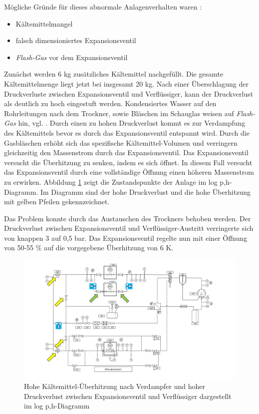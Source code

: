 Mögliche Gründe für dieses abnormale Anlagenverhalten waren :

\begin{itemize}
\item Kältemittelmangel
\item falsch dimensioniertes Expansionsventil
\item \textit{Flash-Gas} vor dem Expansionsventil
\end{itemize}

Zunächst werden 6 kg zusätzliches Kältemittel nachgefüllt. Die gesamte Kältemittelmenge liegt jetzt bei insgesamt 20 kg. Nach einer Überschlagung der Druckverluste zwischen Expansionsventil und Verflüssiger, kann der Druckverlust als deutlich zu hoch eingestuft werden. Kondensiertes Wasser auf den Rohrleitungen nach dem Trockner, sowie Bläschen im Schauglas weisen auf \textit{Flash-Gas} hin, vgl. \citep{GAGKG2010}.
Durch einen zu hohen Druckverlust kommt es zur Verdampfung des Kältemittels bevor es durch das Expansionsventil entspannt wird. Durch die Gasbläschen erhöht sich das spezifische Kältemittel-Volumen und verringern gleichzeitig den Massenstrom durch das Expansionsventil. Das Expansionsventil versucht die Überhitzung zu senken, indem es sich öffnet. In diesem Fall versucht das Expansionsventil durch eine vollständige Öffnung einen höheren Massenstrom zu erwirken. Abbildung \ref{fig:Problem_Trockner} zeigt die Zustandspunkte der Anlage im log p,h-Diagramm. Im Diagramm sind der hohe Druckverlust und die hohe Überhitzung mit gelben Pfeilen gekennzeichnet. 

Das Problem konnte durch das Austauschen des Trockners behoben werden. Der Druckverlust zwischen Expansionsventil und Verflüssiger-Austritt verringerte sich von knappen 3 auf 0,5 bar. Das Expansionsventil regelte nun mit einer Öffnung von 50-55 $\%$ auf die vorgegebene Überhitzung von 6 K. 


\begin{figure}[h]
\centering		\includegraphics[page= 2,width=1.120\textwidth]{Pictures/Inbetriebnahme/Inbetriebnahme_Probleme.pdf}
\caption{Hohe Kältemittel-Überhitzung nach Verdampfer und hoher Druckverlust zwischen Expansionsventil und Verflüssiger dargestellt im log p,h-Diagramm}
\label{fig:Problem_Trockner}
\end{figure}

